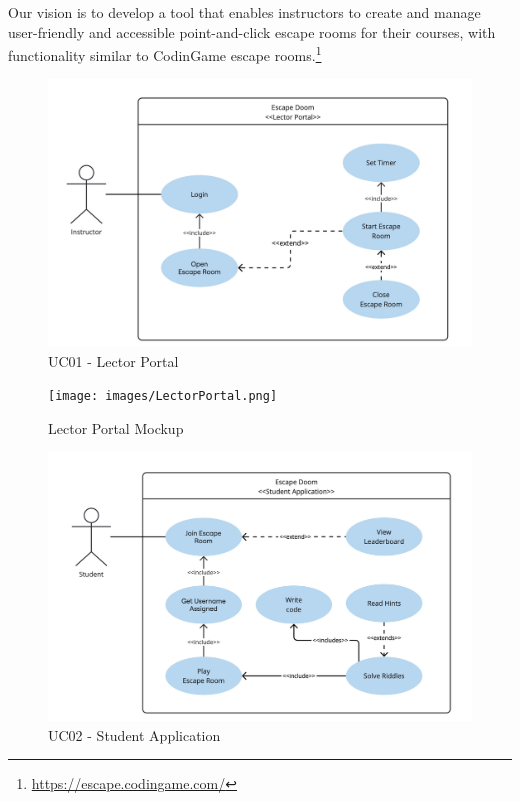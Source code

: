Our vision is to develop a tool that enables instructors to create and manage user-friendly and accessible point-and-click escape rooms for their courses, with functionality similar to CodinGame escape rooms.\footnote{\url{https://escape.codingame.com/}}



\begin{figure}[h!]
    \centering
    \includegraphics[width=\linewidth]{UC-01.png}
    \caption{UC01 - Lector Portal}
    \label{fig:uc-01}
\end{figure}



\begin{figure}[h!]
    \centering
    \texttt{[image: images/LectorPortal.png]}
    \caption{Lector Portal Mockup}
    \label{fig:lector:portal}
\end{figure}


\begin{figure}[h!]
    \centering
    \includegraphics[width=\linewidth]{UC-02.png}
    \caption{UC02 - Student Application}
    \label{fig:uc-02}
\end{figure}
\newpage

